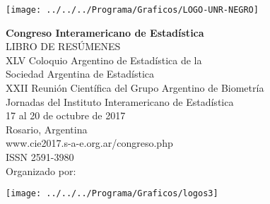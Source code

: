 \documentclass[12pt,a4paper]{article}
\newcommand{\DocYear}{2017}
\newcommand{\DocPlace}{Rosario, Argentina}
\newcommand{\DocURL}{www.cie2017.s-a-e.org.ar/congreso.php}
\begin{document}
\newpage
\noindent
\thispagestyle{empty}
\setcounter{page}{1}
\vspace*{5 mm}
\begin{center} \setlength{\unitlength}{1cm}
  \texttt{[image: ../../../Programa/Graficos/LOGO-UNR-NEGRO]}
\end{center}
{\center
\vspace*{6 mm}
{\LARGE \bf Congreso Interamericano de Estadística} \\ [6mm]
{\Huge LIBRO DE RESÚMENES}  \\ [10mm]
\vspace{2 mm}
{\large XLV Coloquio Argentino de Estadística de la\\Sociedad Argentina de Estadística} \\
{\large XXII Reunión Científica del Grupo Argentino de Biometría} \\
{\large Jornadas del Instituto Interamericano de Estadística} \\
\vspace{7 mm}
{\large 17 al 20 de octubre de 2017} \\[3mm]
{\large \DocPlace} \\[6mm]
{\large \DocURL}\\[6mm]
\vfill
{\large ISSN 2591-3980}\\[6mm] 
{\Large Organizado por:} \\ [3mm]
}
\vspace{3 mm}
\begin{center} \setlength{\unitlength}{1cm}
  \texttt{[image: ../../../Programa/Graficos/logos3]}
\end{center}


\newpage
\thispagestyle{empty}

\vspace*{20cm}
\end{document}
